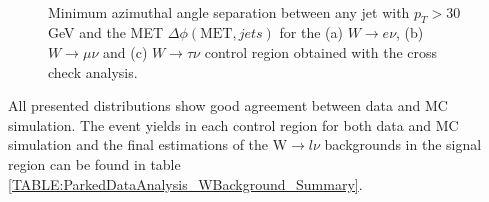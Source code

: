 \begin{figure}[!htb]
\centering
{}
 \\
\caption{Minimum azimuthal angle separation between any jet with $p_{T}>30$ GeV and the \gls{MET} $\Delta\phi(\text{MET},jets)$ for the (a) $W\rightarrow e\nu$, (b) $W\rightarrow\mu\nu$ and (c) $W\rightarrow\tau\nu$ control region obtained with the cross check analysis.}
\label{FIGURE:ParkedDataAnalysis_WBackground_MinDeltaPhi}
\end{figure}

All presented distributions show good agreement between data and \gls{MC} simulation. The event yields in each control region for both data and \gls{MC} simulation and the final estimations of the W$\rightarrow l\nu$ backgrounds in the signal region can be found in table \ref{TABLE:ParkedDataAnalysis_WBackground_Summary}.
 
